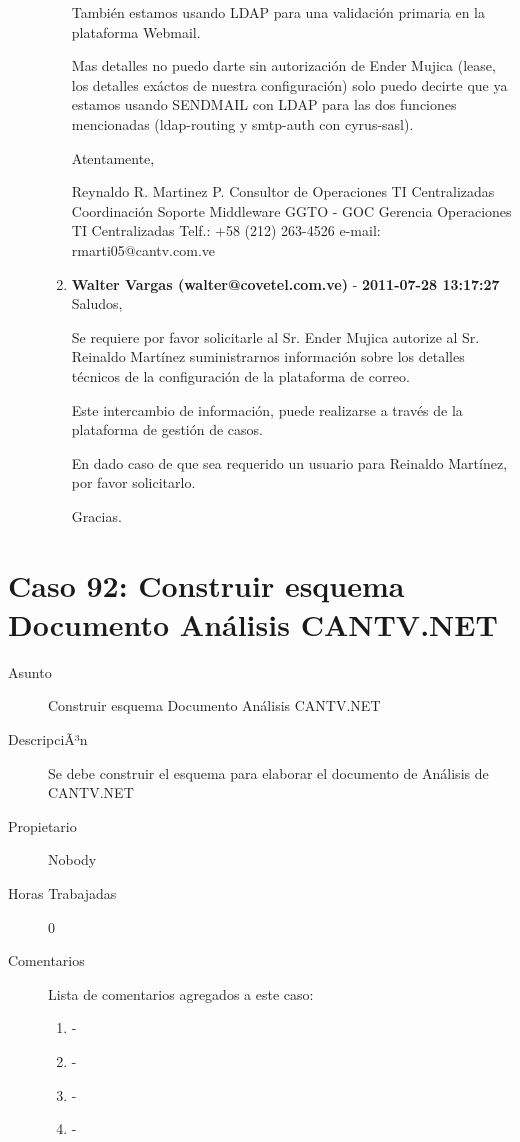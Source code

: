\begin{description}
\begin{enumerate}
 También estamos usando LDAP para una validación primaria en la plataforma
 Webmail.
 
 Mas detalles no puedo darte sin autorización de Ender Mujica (lease,  los
 detalles exáctos de nuestra configuración) solo puedo decirte que ya estamos
 usando SENDMAIL con LDAP para las dos funciones mencionadas (ldap-routing y
 smtp-auth con cyrus-sasl).
 
 Atentamente, 
 
 Reynaldo R. Martinez P.
 Consultor de Operaciones TI Centralizadas
 Coordinación Soporte Middleware
 GGTO - GOC Gerencia Operaciones TI Centralizadas
 Telf.: +58 (212) 263-4526
 e-mail: rmarti05@cantv.com.ve        \item {\bfseries Walter Vargas (walter@covetel.com.ve)  } - {\bfseries 2011-07-28 13:17:27} \\ Saludos,  

Se requiere por favor solicitarle al Sr. Ender Mujica autorize al Sr. Reinaldo
Martínez suministrarnos información sobre los detalles técnicos de la
configuración de la plataforma de correo.

Este intercambio de información, puede realizarse a través de la plataforma de
gestión de casos. 

En dado caso de que sea requerido un usuario para Reinaldo Martínez, por favor
solicitarlo. 

Gracias.    \end{enumerate}

\end{description}

\section{Caso 92: Construir esquema Documento Análisis CANTV.NET  }

\begin{description}

\item[Asunto] Construir esquema Documento Análisis CANTV.NET \item[DescripciÃ³n] Se debe construir el esquema para elaborar el documento de Análisis de
CANTV.NET\item[Propietario] Nobody\item[Horas Trabajadas] 0

\item[Comentarios] Lista de comentarios agregados a este caso:  
\begin{enumerate}
        \item {\bfseries  } - {\bfseries } \\         \item {\bfseries  } - {\bfseries } \\         \item {\bfseries  } - {\bfseries } \\         \item {\bfseries  } - {\bfseries } \\     \end{enumerate}

\end{description}

